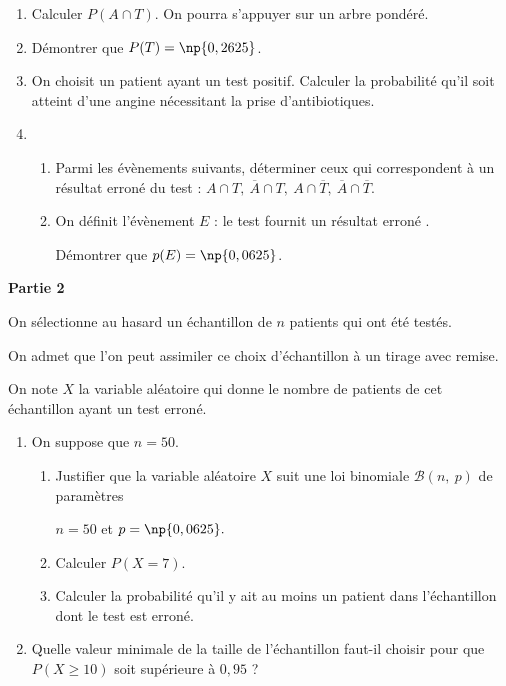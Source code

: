 \documentclass[10pt,a4paper]{article}
\begin{document}
\medskip

\begin{enumerate}
\item Calculer $P(A \cap T)$. On pourra s'appuyer sur un arbre pondéré.
\item Démontrer que $P(T) = \np{0,2625}$.
\item On choisit un patient ayant un test positif. Calculer la probabilité qu'il soit atteint d'une angine nécessitant la prise d'antibiotiques.
\item
	\begin{enumerate}
		\item Parmi les évènements suivants, déterminer ceux qui correspondent à un résultat erroné du test :  $A \cap T,\: \overline{A} \cap T,\:A \cap \overline{T},\: \overline{A} \cap \overline{T}$.
		\item On définit l'évènement $E$ : \og le test fournit un résultat erroné \fg.
		
Démontrer que $p(E) = \np{0,0625}$.
	\end{enumerate}
\end{enumerate}

\bigskip

\textbf{Partie 2}

\medskip

On sélectionne au hasard un échantillon de $n$ patients qui ont été testés.

On admet que l'on peut assimiler ce choix d'échantillon à un tirage avec remise.

On note $X$ la variable aléatoire qui donne le nombre de patients de cet échantillon ayant un test erroné.

\medskip

\begin{enumerate}
\item On suppose que $n = 50$.
	\begin{enumerate}
		\item Justifier que la variable aléatoire $X$ suit une loi binomiale $\mathcal{B}(n,\: p)$ de paramètres
		
$n = 50$ et $p = \np{0,0625}.$
		\item Calculer $P(X = 7)$.
		\item Calculer la probabilité qu'il y ait au moins un patient dans l'échantillon dont le test est erroné.
	\end{enumerate}	
\item Quelle valeur minimale de la taille de l'échantillon faut-il choisir pour que $P(X \geqslant 10)$ soit supérieure à $0,95$ ?
\end{enumerate}
\end{document}
